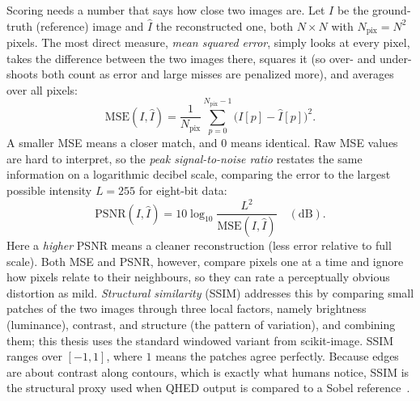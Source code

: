 Scoring needs a number that says how close two images are. Let $I$ be the ground-truth (reference) image and $\hat{I}$ the reconstructed one, both $N\times N$ with $N_{\mathrm{pix}}=N^2$ pixels. The most direct measure, \emph{mean squared error}, simply looks at every pixel, takes the difference between the two images there, squares it (so over- and under-shoots both count as error and large misses are penalized more), and averages over all pixels:
\begin{equation}
\mathrm{MSE}(I,\hat{I}) = \frac{1}{N_{\mathrm{pix}}}\sum_{p=0}^{N_{\mathrm{pix}}-1}\bigl(I[p]-\hat{I}[p]\bigr)^2 .
\end{equation}
A smaller MSE means a closer match, and $0$ means identical. Raw MSE values are hard to interpret, so the \emph{peak signal-to-noise ratio} restates the same information on a logarithmic decibel scale, comparing the error to the largest possible intensity $L=255$ for eight-bit data:
\begin{equation}
\mathrm{PSNR}(I,\hat{I}) = 10\log_{10}\frac{L^2}{\mathrm{MSE}(I,\hat{I})}\quad(\mathrm{dB}).
\end{equation}
Here a \emph{higher} PSNR means a cleaner reconstruction (less error relative to full scale). Both MSE and PSNR, however, compare pixels one at a time and ignore how pixels relate to their neighbours, so they can rate a perceptually obvious distortion as mild. \emph{Structural similarity} (SSIM) addresses this by comparing small patches of the two images through three local factors, namely brightness (luminance), contrast, and structure (the pattern of variation), and combining them; this thesis uses the standard windowed variant from scikit-image. SSIM ranges over $[-1,1]$, where $1$ means the patches agree perfectly. Because edges are about contrast along contours, which is exactly what humans notice, SSIM is the structural proxy used when QHED output is compared to a Sobel reference~\cite{Chetia2021ImprovedSobelNEQR}.

